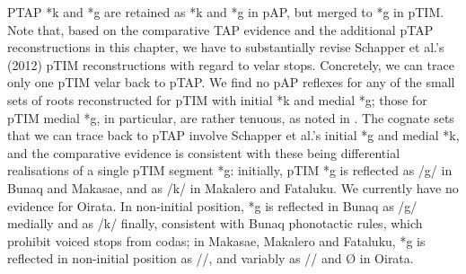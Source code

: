 PTAP *k and *g are retained as *k and *g in pAP, but merged to *g in pTIM. Note that, based on the comparative TAP evidence and the additional pTAP reconstructions in this chapter, we have to substantially revise Schapper et al.'s (2012) pTIM reconstructions with regard to velar stops. Concretely, we can trace only one pTIM velar back to pTAP. We find no pAP reflexes for any of the small sets of roots reconstructed for pTIM with initial *k and medial *g; those for pTIM medial *g, in particular, are rather tenuous, as noted in \citet[212]{SchapperEtAl2012}. The cognate sets that we can trace back to pTAP involve Schapper et al.'s initial *g and medial *k, and the comparative evidence is consistent with these being differential realisations of a single pTIM segment *g: initially, pTIM *g is reflected as /g/ in Bunaq and Makasae, and as /k/ in Makalero and Fataluku. We currently have no evidence for Oirata. In non-initial position, *g is reflected in Bunaq as /g/ medially and as /k/ finally, consistent with Bunaq phonotactic rules, which prohibit voiced stops from codas; in Makasae, Makalero and Fataluku, *g is reflected in non-initial position as /{\textglotstop}/, and variably as /{\textglotstop}/ and {\O} in Oirata. 
 

